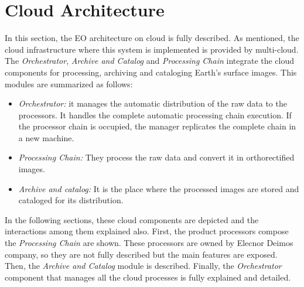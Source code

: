\section{Cloud Architecture}

In this section, the \ac{EO} architecture on cloud is fully described. As
mentioned, the cloud infrastructure where this system is implemented is provided
by \bonfire multi-cloud. The \emph{Orchestrator}, \emph{Archive and Catalog} and \emph{Processing
Chain} integrate the cloud components for processing, archiving and cataloging
Earth's surface images. This modules are summarized as follows:
\begin{itemize}
\item \emph{Orchestrator:} it manages the automatic distribution of the raw data to the processors. It handles the complete automatic processing chain execution.  If the processor chain is occupied, the manager replicates the complete chain in a new machine.
\item \emph{Processing Chain:} They process the raw data and convert it in orthorectified images. 
\item \emph{Archive and catalog:} It is the place where the processed images are stored and cataloged for its distribution.
\end{itemize}

In the following sections, these cloud components are
depicted and the interactions among them explained also. First, the product
processors compose the \emph{Processing Chain} are shown. These processors are owned
by Elecnor Deimos company, so they are not fully described but the main features
are exposed. Then, the \emph{Archive and Catalog}
module is described. Finally, the \emph{Orchestrator} component that manages all the
cloud processes is fully explained and detailed.
 



